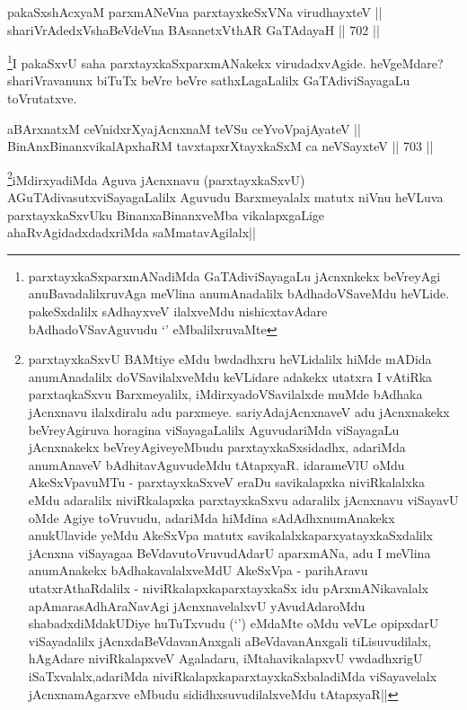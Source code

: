 \begin{shl}
pakaSxshAcxyaM parxmANeVna parxtayxkeSxVNa virudhayxteV || \\
shariVrAdedxVshaBeVdeVna BAsanetxV\s thAR GaTAdayaH ||  702 ||  
\end{shl}

\begin{artha}
\footnote{parxtayxkaSxparxmANadiMda GaTAdiviSayagaLu jAcnxnkekx beVreyAgi anuBavadalilxruvAga meVlina anumAnadalilx bAdhadoVSaveMdu heVLide. pakeSxdalilx sAdhayxveV ilalxveMdu nishicxtavAdare bAdhadoVSavAguvudu `\stext' eMbalilxruvaMte}I pakaSxvU saha parxtayxkaSxparxmANakekx virudadxvAgide. heVgeMdare? shariVravanunx biTuTx beVre beVre sathxLagaLalilx GaTAdiviSayagaLu toVrutatxve.
\end{artha}

\begin{shl}
aBArxnatxM ceVnidxrXyajAcnxnaM teVSu ceYvoVpajAyateV || \\
BinAnxBinanxvikalApxhaRM tavxtapxrXtayxkaSxM ca neVSayxteV ||  703 ||  
\end{shl}

\begin{artha}
\footnote{parxtayxkaSxvU BAMtiye eMdu bwdadhxru heVLidalilx hiMde mADida anumAnadalilx doVSavilalxveMdu keVLidare adakekx utatxra I vAtiRka parxtaqkaSxvu Barxmeyalilx, iMdirxyadoVSavilalxde muMde bAdhaka jAcnxnavu ilalxdiralu adu parxmeye. sariyAdajAcnxnaveV adu jAcnxnakekx beVreyAgiruva horagina viSayagaLalilx AguvudariMda viSayagaLu jAcnxnakekx beVreyAgiveyeMbudu parxtayxkaSxsidadhx, adariMda anumAnaveV bAdhitavAguvudeMdu tAtapxyaR. idarameVlU oMdu AkeSxVpavuMTu - parxtayxkaSxveV eraDu savikalapxka niviRkalalxka eMdu adaralilx niviRkalapxka parxtayxkaSxvu adaralilx jAcnxnavu viSayavU oMde Agiye toVruvudu, adariMda hiMdina sAdAdhxnumAnakekx anukUlavide yeMdu AkeSxVpa matutx savikalalxkaparxyatayxkaSxdalilx jAcnxna viSayagaa BeVdavutoVruvudAdarU aparxmANa, adu I meVlina anumAnakekx bAdhakavalalxveMdU AkeSxVpa - parihAravu utatxrAthaRdalilx - niviRkalapxkaparxtayxkaSx idu pArxmANikavalalx apAmarasAdhAraNavAgi jAcnxnavelalxvU yAvudAdaroMdu shabadxdiMdakUDiye huTuTxvudu (`\stext') eMdaMte oMdu veVLe opipxdarU viSayadalilx jAcnxdaBeVdavanAnxgali aBeVdavanAnxgali tiLisuvudilalx, hAgAdare niviRkalapxveV Agaladaru, iMtahavikalapxvU vwdadhxrigU iSaTxvalalx,adariMda niviRkalapxkaparxtayxkaSxbaladiMda viSayavelalx jAcnxnamAgarxve eMbudu sididhxsuvudilalxveMdu tAtapxyaR||}iMdirxyadiMda Aguva jAcnxnavu (parxtayxkaSxvU) AGuTAdivasutxviSayagaLalilx Aguvudu Barxmeyalalx matutx niVnu heVLuva parxtayxkaSxvUku BinanxaBinanxveMba vikalapxgaLige ahaRvAgidadxdadxriMda saMmatavAgilalx||
\end{artha}

